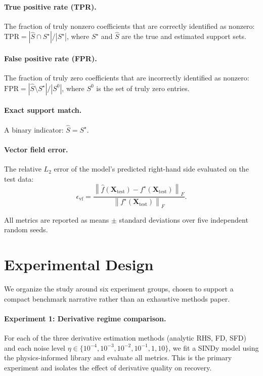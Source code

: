 \documentclass[12pt]{article}
\newcommand{\bX}{\mathbf{X}}
\newcommand{\norm}[1]{\left\lVert #1 \right\rVert}
\begin{document}
\paragraph{True positive rate (TPR).}
The fraction of truly nonzero coefficients that are correctly identified as nonzero: $\text{TPR} = |\hat{S} \cap S^\star| / |S^\star|$, where $S^\star$ and $\hat{S}$ are the true and estimated support sets.

\paragraph{False positive rate (FPR).}
The fraction of truly zero coefficients that are incorrectly identified as nonzero: $\text{FPR} = |\hat{S} \setminus S^\star| / |S^0|$, where $S^0$ is the set of truly zero entries.

\paragraph{Exact support match.}
A binary indicator: $\hat{S} = S^\star$.

\paragraph{Vector field error.}
The relative $L_2$ error of the model's predicted right-hand side evaluated on the test data:
\begin{equation}
\epsilon_\text{vf} = \frac{\norm{\hat{f}(\bX_\text{test}) - f^\star(\bX_\text{test})}_F}{\norm{f^\star(\bX_\text{test})}_F}.
\end{equation}

All metrics are reported as means $\pm$ standard deviations over five independent random seeds.


\section{Experimental Design}
\label{sec:experiments}

We organize the study around six experiment groups, chosen to support a compact benchmark narrative rather than an exhaustive methods paper.

\paragraph{Experiment 1: Derivative regime comparison.}
For each of the three derivative estimation methods (analytic RHS, FD, SFD) and each noise level $\eta \in \{10^{-4}, 10^{-3}, 10^{-2}, 10^{-1}, 1, 10\}$, we fit a SINDy model using the physics-informed library and evaluate all metrics.
This is the primary experiment and isolates the effect of derivative quality on recovery.
\end{document}
